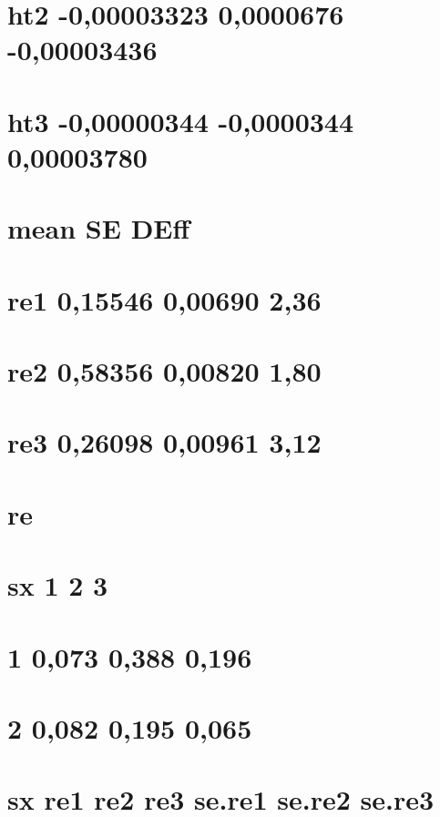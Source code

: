 \documentclass[]{book}
\theoremstyle{definition}
\theoremstyle{definition}
\theoremstyle{definition}
\theoremstyle{remark}
\begin{document}
\section{ht2 -0,00003323 0,0000676
-0,00003436}\label{ht2--000003323-00000676--000003436-2}

\section{ht3 -0,00000344 -0,0000344
0,00003780}\label{ht3--000000344--00000344-000003780-2}

\section{mean SE DEff}\label{mean-se-deff}

\section{re1 0,15546 0,00690 2,36}\label{re1-015546-000690-236}

\section{re2 0,58356 0,00820 1,80}\label{re2-058356-000820-180}

\section{re3 0,26098 0,00961 3,12}\label{re3-026098-000961-312}

\section{re}\label{re}

\section{sx 1 2 3}\label{sx-1-2-3}

\section{1 0,073 0,388 0,196}\label{section-42}

\section{2 0,082 0,195 0,065}\label{section-43}

\section{sx re1 re2 re3 se.re1 se.re2
se.re3}\label{sx-re1-re2-re3-se.re1-se.re2-se.re3}
\end{document}
